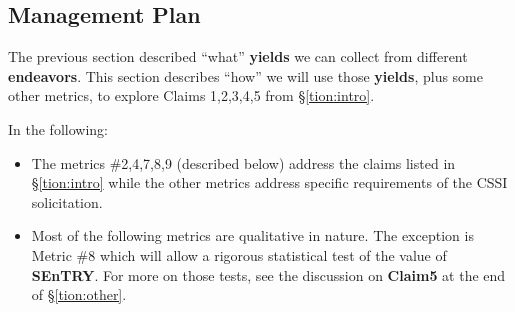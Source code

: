 \documentclass{NSF}
\newenvironment{myitemize}
{ \begin{itemize}
    \setlength{\itemsep}{0pt}
    \setlength{\parskip}{0pt}
    \setlength{\parsep}{0pt}     }
{ \end{itemize}                  }
\newcommand{\bi}{\begin{myitemize}}
\newcommand{\ei}{\end{myitemize}}
\newcommand{\tion}[1]{\S\ref{tion:#1}}
\newcommand{\IT}{{\bf {\sffamily SEnTRY}}}
\begin{document}
\begin{nsfdescription}

 



\section{Management Plan}\label{tion:plan}

The previous section described ``what''  {\bf yields} we can collect from  different {\bf endeavors}.
This section describes ``how'' we will use those {\bf yields}, plus some other metrics,
to explore  Claims 1,2,3,4,5 from \tion{intro}.

In the following:
\bi
\item
  The metrics \#2,4,7,8,9 (described below)  address the claims listed in \tion{intro} while the
 other metrics address   specific requirements
of the CSSI solicitation.
\item
Most of the following metrics are qualitative in nature. The exception is Metric \#8
which will allow a rigorous statistical test of the value of {\IT}. For more on those tests,
see the discussion on {\bf Claim5} at the end of \tion{other}. \ei
\noindent

\end{nsfdescription}
\end{document}
